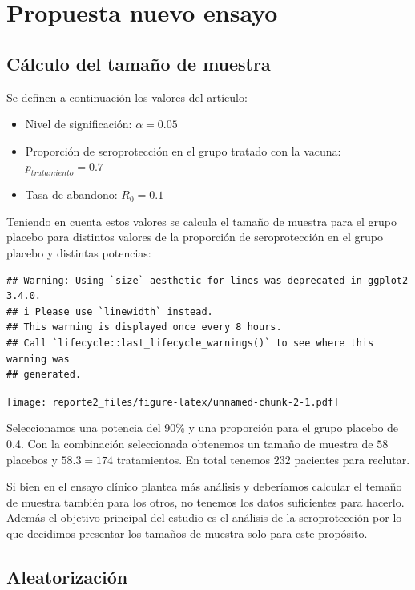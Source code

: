 \documentclass[
]{article}
\begin{document}
\section{Propuesta nuevo ensayo}\label{propuesta-nuevo-ensayo}

\subsection{Cálculo del tamaño de
muestra}\label{cuxe1lculo-del-tamauxf1o-de-muestra}

Se definen a continuación los valores del artículo:

\begin{itemize}
\item
  Nivel de significación: \(\alpha=0.05\)
\item
  Proporción de seroprotección en el grupo tratado con la vacuna:
  \(p_{tratamiento}=0.7\)
\item
  Tasa de abandono: \(R_0=0.1\)
\end{itemize}

Teniendo en cuenta estos valores se calcula el tamaño de muestra para el
grupo placebo para distintos valores de la proporción de seroprotección
en el grupo placebo y distintas potencias:

\begin{verbatim}
## Warning: Using `size` aesthetic for lines was deprecated in ggplot2 3.4.0.
## i Please use `linewidth` instead.
## This warning is displayed once every 8 hours.
## Call `lifecycle::last_lifecycle_warnings()` to see where this warning was
## generated.
\end{verbatim}

\texttt{[image: reporte2\_files/figure-latex/unnamed-chunk-2-1.pdf]}

Seleccionamos una potencia del 90\% y una proporción para el grupo
placebo de 0.4. Con la combinación seleccionada obtenemos un tamaño de
muestra de \(58\) placebos y \(58 . 3 = 174\) tratamientos. En total
tenemos \(232\) pacientes para reclutar.

Si bien en el ensayo clínico plantea más análisis y deberíamos calcular
el temaño de muestra también para los otros, no tenemos los datos
suficientes para hacerlo. Además el objetivo principal del estudio es el
análisis de la seroprotección por lo que decidimos presentar los tamaños
de muestra solo para este propósito.

\subsection{Aleatorización}\label{aleatorizaciuxf3n}
\end{document}
